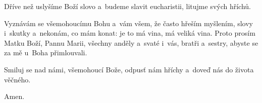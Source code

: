 \Vbardot{} Dříve než uslyšíme Boží slovo a~budeme slavit eucharistii, litujme svých hříchů.

\mbox{}

Vyznávám se všemohoucímu Bohu a~vám všem, že často hřeším myšlením, slovy i~skutky a~nekonám, co mám konat:
je to má vina, má veliká vina. Proto prosím Matku Boží, Pannu Marii,
všechny anděly a~svaté i~vás, bratři a~sestry, abyste se za mě u~Boha
přimlouvali.

\Vbardot{} Smiluj se nad námi, všemohoucí Bože, odpusť nám hříchy a~doveď nás do života věčného.

\Rbardot{} Amen.
